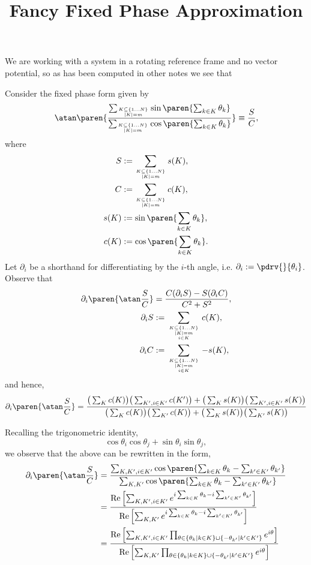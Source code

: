 \documentclass[onecolumn,amsmath,amssymb,nofootinbib,floatfix]{revtex4}
\title{Fancy Fixed Phase Approximation}
\begin{document}
We are working with a system in a rotating reference frame and no vector potential, so as has been computed in other notes we see that

Consider the fixed phase form given by
$$\atan\paren{\frac{\sum_{K\subseteq \{1\dots N\}\atop |K|=m} \sin\paren{\sum_{k\in K} \theta_k}}{\sum_{K\subseteq \{1\dots N\}\atop |K|=m} \cos\paren{\sum_{k\in K} \theta_k}}}\equiv\frac{S}{C},
$$
where
$$
\begin{aligned}
S&:=\sum_{K\subseteq \{1\dots N\}\atop |K|=m} s(K),\\
C&:=\sum_{K\subseteq \{1\dots N\}\atop |K|=m} c(K),\\
s(K)&:=\sin\paren{\sum_{k\in K} \theta_k},\\
c(K)&:=\cos\paren{\sum_{k\in K} \theta_k}.\\
\end{aligned}
$$
Let $\partial_i$ be a shorthand for differentiating by the $i$-th angle, i.e. $\partial_i:=\pdrv{}{\theta_i}$.  Observe that
$$
\begin{aligned}
\partial_i \paren{\atan\frac{S}{C}} &= \frac{C(\partial_i S) - S(\partial_i C)}{C^2+S^2},\\
\partial_i S&:=\sum_{{K\subseteq \{1\dots N\}\atop |K|=m}\atop i\in K} c(K),\\
\partial_i C&:=\sum_{{K\subseteq \{1\dots N\}\atop |K|=m}\atop i\in K} -s(K),\\
\end{aligned}
$$
and hence,
$$
\partial_i \paren{\atan\frac{S}{C}} = \frac{\big(\sum_K c(K)\big)\big(\sum_{K',i\in K'} c(K')\big)+\big(\sum_K s(K)\big)\big(\sum_{K',i\in K'} s(K)\big)}{\big(\sum_K c(K)\big)\big(\sum_{K'} c(K)\big)+\big(\sum_K s(K)\big)\big(\sum_{K'} s(K)\big)}
$$

Recalling the trigonometric identity,
$$\cos\theta_i\cos\theta_j+\sin\theta_i\sin\theta_j,$$
we observe that the above can be rewritten in the form,
$$
\begin{aligned}
\partial_i \paren{\atan\frac{S}{C}}
&= \frac{\sum_{K,K',i\in K'}\cos\paren{\sum_{k\in K} \theta_k - \sum_{k'\in K'} \theta_{k'}}}
        {\sum_{K,K'}\cos\paren{\sum_{k\in K} \theta_k - \sum_{k'\in K'} \theta_{k'}}}\\
&= \frac{\text{Re}\left[\sum_{K,K',i\in K'}e^{i\sum_{k\in K} \theta_k-i\sum_{k'\in K'} \theta_{k'}}\right]}
        {\text{Re}\left[\sum_{K,K'}e^{i\sum_{k\in K} \theta_k-i\sum_{k'\in K'} \theta_{k'}}\right]}\\
&= \frac{\text{Re}\left[\sum_{K,K',i\in K'}\prod_{\theta\in\{\theta_k|k\in K\}\cup\{-\theta_{k'}|k'\in K'\}} e^{i\theta}\right]}
        {\text{Re}\left[\sum_{K,K'}\prod_{\theta\in\{\theta_k|k\in K\}\cup\{-\theta_{k'}|k'\in K'\}} e^{i\theta}\right]}\\
\end{aligned}
$$
\end{document}
